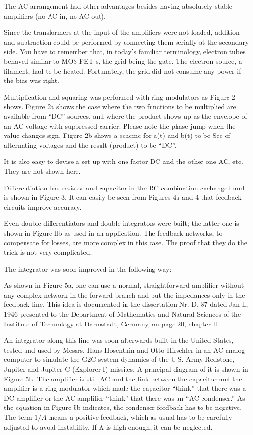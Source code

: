 \documentclass[11pt, a4paper]{article}
\begin{document}
The AC arrangement had other advantages besides having absolutely stable amplifiers (no AC in, no AC out).

Since the transformers at the input of the amplifiers were not loaded, addition and subtraction could be performed by connecting them serially at the secondary side. You have to remember that, in today's familiar terminology, electron tubes behaved similar to MOS FET-s, the grid being the gate. The electron source, a filament, had to be heated. Fortunately, the grid did not consume any power if the bias was right.

Multiplication and squaring was performed with ring modulators as Figure 2 shows. Figure 2a shows the case where the two functions to be multiplied are available from ``DC'' sources, and where the product shows up as the envelope of an AC voltage with suppressed carrier. Please note the phase jump when the value changes sign. Figure 2b shows a scheme for a(t) and b(t) to be See of alternating voltages and the result (product) to be ``DC''.

It is also easy to devise a set up with one factor DC and the other one AC, etc. They are not shown here.

Differentiation has resistor and capacitor in the RC combination exchanged and is shown in Figure 3. It can easily be seen from Figures 4a and 4 that feedback circuits improve accuracy.

Even double differentiators and double integrators were built; the latter one is shown in Figure llb as used in an application. The feedback networks, to compensate for losses, are more complex in this case. The proof that they do the trick is not very complicated.

The integrator was soon improved in the following way:

As shown in Figure 5a, one can use a normal, straightforward amplifier without any complex network in the forward branch and put the impedances only in the feedback line. This idea is documented in the dissertation Nr. D. 87 dated Jan ll, 1946 presented to the Department of Mathematics and Natural Sciences of the Institute of Technology at Darmstadt, Germany, on page 20, chapter ll.

An integrator along this line was soon afterwards built in the United States, tested and used by Messrs. Hans Hosenthin and Otto Hirschler in an AC analog computer to simulate the G2C system dynamics of the U.S. Army Redstone, Jupiter and Jupiter C (Explorer I) missiles. A principal diagram of it is shown in Figure 5b. The amplifier is still AC and the link between the capacitor and the amplifier is a ring modulator which made the capacitor ``think'' that there was a DC amplifier or the AC amplifier ``think'' that there was an ``AC condenser.'' As the equation in Figure 5b indicates, the condenser feedback has to be negative. The term $1/A$ means a positive feedback, which as usual has to be carefully adjusted to avoid instability. If A is high enough, it can be neglected.
\end{document}
